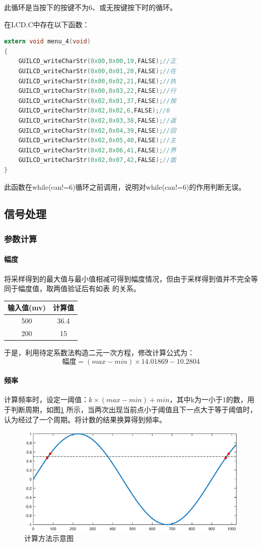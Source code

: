 \documentclass[12pt]{article}
\begin{document}
此循环是当按下的按键不为6、或无按键按下时的循环。\par
在LCD.C中存在以下函数：
\begin{lstlisting}[language=C]
extern void menu_4(void)
{
    GUILCD_writeCharStr(0x00,0x00,19,FALSE);//正
	GUILCD_writeCharStr(0x00,0x01,20,FALSE);//在
	GUILCD_writeCharStr(0x00,0x02,21,FALSE);//执
	GUILCD_writeCharStr(0x00,0x03,22,FALSE);//行
	GUILCD_writeCharStr(0x02,0x01,37,FALSE);//按
    GUILCD_writeCharStr(0x02,0x02,6,FALSE);//6
    GUILCD_writeCharStr(0x02,0x03,38,FALSE);//返
    GUILCD_writeCharStr(0x02,0x04,39,FALSE);//回
    GUILCD_writeCharStr(0x02,0x05,40,FALSE);//主
    GUILCD_writeCharStr(0x02,0x06,41,FALSE);//界
    GUILCD_writeCharStr(0x02,0x07,42,FALSE);//面
}
\end{lstlisting}
此函数在while(can!=6)循环之前调用，说明对while(can!=6)的作用判断无误。
\subsection{信号处理}
\subsubsection{参数计算}
\paragraph{幅度}
将采样得到的最大值与最小值相减可得到幅度情况，但由于采样得到值并不完全等同于幅度值，取两值验证后有如表
的关系。
\begin{table}[htbp]
  \centering
\begin{tabular}{|c|c|}
  \hline
  输入值(mv)&计算值
  \\
  \hline
 500 &36.4
  \\
  \hline
  200&15
  \\
  \hline
\end{tabular}
\end{table}\par
于是，利用待定系数法构造二元一次方程，修改计算公式为：
\begin{equation}
  \mbox{幅度}=(max-min)\times 14.01869-10.2804
\end{equation}
\paragraph{频率}
计算频率时，设定一阈值：$k\times (max-min)+min$，其中k为一小于1的数，用于判断周期，如图\ref{jsff}
所示，当两次出现当前点小于阈值且下一点大于等于阈值时，认为经过了一个周期。将计数的结果换算得到频率。
\begin{figure}[htbp]
  \centering
  \includegraphics[width=.8\textwidth]{untitled}
  \caption{计算方法示意图}\label{jsff}
\end{figure}
\end{document}
